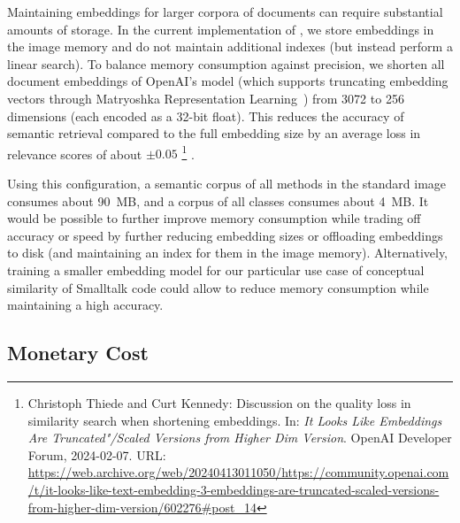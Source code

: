 Maintaining embeddings for larger corpora of documents can require substantial amounts of storage.
In the current implementation of \semtex, we store embeddings in the image memory and do not maintain additional indexes (but instead perform a linear search).
To balance memory consumption against precision, we shorten all document embeddings of OpenAI's  model (which supports truncating embedding vectors through Matryoshka Representation Learning~\cite{kusupati2024matryoshka}) from 3072 to 256 dimensions (each encoded as a 32-bit float).
This reduces the accuracy of semantic retrieval compared to the full embedding size by an average loss in relevance scores of about $\pm 0.05$%
\footnote{Christoph Thiede and Curt Kennedy: Discussion on the quality loss in similarity search when shortening embeddings. In: \emph{It Looks Like  Embeddings Are Truncated"/Scaled Versions from Higher Dim Version}. OpenAI Developer Forum, 2024-02-07. URL: \url{https://web.archive.org/web/20240413011050/https://community.openai.com/t/it-looks-like-text-embedding-3-embeddings-are-truncated-scaled-versions-from-higher-dim-version/602276\#post_14}}%
.

Using this configuration, a semantic corpus of all methods in the standard image consumes about \qty{90}{MB}, and a corpus of all classes consumes about \qty{4}{MB}.
It would be possible to further improve memory consumption while trading off accuracy or speed by further reducing embedding sizes or offloading embeddings to disk (and maintaining an index for them in the image memory).
Alternatively, training a smaller embedding model for our particular use case of conceptual similarity of Smalltalk code could allow to reduce memory consumption while maintaining a high accuracy.

\subsection*{Monetary Cost}
\label{sec:discussion/performance/money}

